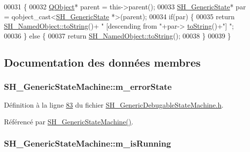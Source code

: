 \begin{DoxyCode}
00031 \{
00032     \hyperlink{classQObject}{QObject}* parent = this->parent();
00033     \hyperlink{classSH__GenericState}{SH\_GenericState}* par = qobject\_cast<\hyperlink{classSH__GenericState}{SH\_GenericState} *>(parent);
00034     \textcolor{keywordflow}{if}(par) \{
00035         \textcolor{keywordflow}{return} \hyperlink{classSH__NamedObject_a9f4b19df6a96a17daaf1060b3019ef47}{SH\_NamedObject::toString}()+ \textcolor{stringliteral}{" [descending from "}+par->
      \hyperlink{classSH__GenericState_a7779babbb40f3f8faa71112204d9804f}{toString}()+\textcolor{stringliteral}{"] "};
00036     \} \textcolor{keywordflow}{else} \{
00037         \textcolor{keywordflow}{return} \hyperlink{classSH__NamedObject_a9f4b19df6a96a17daaf1060b3019ef47}{SH\_NamedObject::toString}();
00038     \}
00039 \}
\end{DoxyCode}


\subsection{Documentation des données membres}
\hypertarget{classSH__GenericStateMachine_acdf020d8c235f727096da9e613d7e4d7}{
\subsubsection[{m\-\_\-error\-State}]{\setlength{\rightskip}{0pt plus 5cm}S\-H\-\_\-\-Generic\-State\-Machine\-::m\-\_\-error\-State\hspace{0.3cm}{\ttfamily [private]}}}\label{classSH__GenericStateMachine_acdf020d8c235f727096da9e613d7e4d7}


Définition à la ligne \hyperlink{SH__GenericDebugableStateMachine_8h_source_l00083}{83} du fichier \hyperlink{SH__GenericDebugableStateMachine_8h_source}{S\-H\-\_\-\-Generic\-Debugable\-State\-Machine.\-h}.



Référencé par \hyperlink{classSH__GenericStateMachine_ac34a1ac375e680e27708097c4f099f59}{S\-H\-\_\-\-Generic\-State\-Machine()}.

\hypertarget{classSH__GenericStateMachine_ad03681101e09322e6a2ebb1703bc647b}{
\subsubsection[{m\-\_\-is\-Running}]{\setlength{\rightskip}{0pt plus 5cm}S\-H\-\_\-\-Generic\-State\-Machine\-::m\-\_\-is\-Running\hspace{0.3cm}{\ttfamily [private]}}}\label{classSH__GenericStateMachine_ad03681101e09322e6a2ebb1703bc647b}


